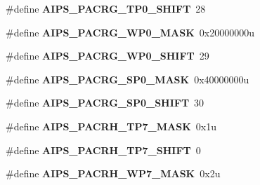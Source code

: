 \begin{DoxyCompactItemize}
\item 
\#define {\bfseries A\+I\+P\+S\+\_\+\+P\+A\+C\+R\+G\+\_\+\+T\+P0\+\_\+\+S\+H\+I\+FT}~28\hypertarget{group__AIPS__Register__Masks_ga1aa2552c72fd7b2bd6f6909e23e58fd7}{}\label{group__AIPS__Register__Masks_ga1aa2552c72fd7b2bd6f6909e23e58fd7}

\item 
\#define {\bfseries A\+I\+P\+S\+\_\+\+P\+A\+C\+R\+G\+\_\+\+W\+P0\+\_\+\+M\+A\+SK}~0x20000000u\hypertarget{group__AIPS__Register__Masks_gaec93d2d689588913e595fb43f40f093a}{}\label{group__AIPS__Register__Masks_gaec93d2d689588913e595fb43f40f093a}

\item 
\#define {\bfseries A\+I\+P\+S\+\_\+\+P\+A\+C\+R\+G\+\_\+\+W\+P0\+\_\+\+S\+H\+I\+FT}~29\hypertarget{group__AIPS__Register__Masks_ga0003fbf3eef9b2c8e4f741ef0f3275de}{}\label{group__AIPS__Register__Masks_ga0003fbf3eef9b2c8e4f741ef0f3275de}

\item 
\#define {\bfseries A\+I\+P\+S\+\_\+\+P\+A\+C\+R\+G\+\_\+\+S\+P0\+\_\+\+M\+A\+SK}~0x40000000u\hypertarget{group__AIPS__Register__Masks_gacaac7fd168acd47222b0c9e9a3986323}{}\label{group__AIPS__Register__Masks_gacaac7fd168acd47222b0c9e9a3986323}

\item 
\#define {\bfseries A\+I\+P\+S\+\_\+\+P\+A\+C\+R\+G\+\_\+\+S\+P0\+\_\+\+S\+H\+I\+FT}~30\hypertarget{group__AIPS__Register__Masks_ga22fdf34af3638622ac5f4f1079f76e0b}{}\label{group__AIPS__Register__Masks_ga22fdf34af3638622ac5f4f1079f76e0b}

\item 
\#define {\bfseries A\+I\+P\+S\+\_\+\+P\+A\+C\+R\+H\+\_\+\+T\+P7\+\_\+\+M\+A\+SK}~0x1u\hypertarget{group__AIPS__Register__Masks_gab6e73c7e30191e0fad1f05b098beea8d}{}\label{group__AIPS__Register__Masks_gab6e73c7e30191e0fad1f05b098beea8d}

\item 
\#define {\bfseries A\+I\+P\+S\+\_\+\+P\+A\+C\+R\+H\+\_\+\+T\+P7\+\_\+\+S\+H\+I\+FT}~0\hypertarget{group__AIPS__Register__Masks_ga9324cebe55b33bee69d86a86cd9d4767}{}\label{group__AIPS__Register__Masks_ga9324cebe55b33bee69d86a86cd9d4767}

\item 
\#define {\bfseries A\+I\+P\+S\+\_\+\+P\+A\+C\+R\+H\+\_\+\+W\+P7\+\_\+\+M\+A\+SK}~0x2u\hypertarget{group__AIPS__Register__Masks_ga85499f7844098271ae35ce9c75e0e216}{}\label{group__AIPS__Register__Masks_ga85499f7844098271ae35ce9c75e0e216}


\end{DoxyCompactItemize}
